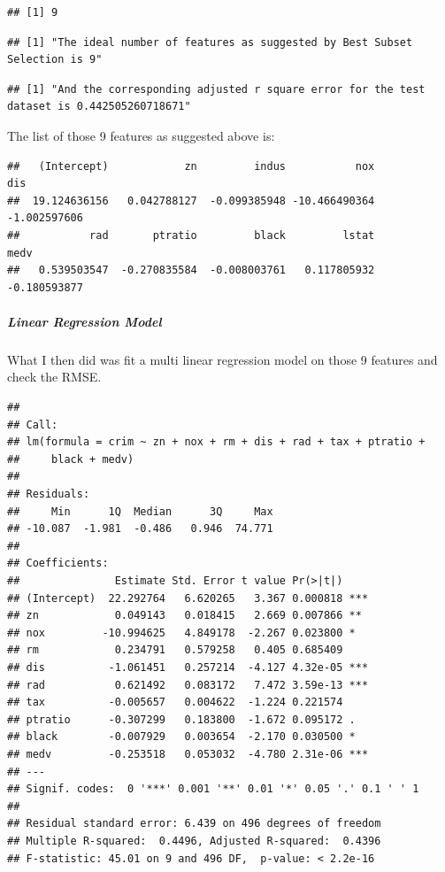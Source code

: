 \documentclass[
]{article}
\begin{document}
\begin{verbatim}
## [1] 9
\end{verbatim}

\begin{verbatim}
## [1] "The ideal number of features as suggested by Best Subset Selection is 9"
\end{verbatim}

\begin{verbatim}
## [1] "And the corresponding adjusted r square error for the test dataset is 0.442505260718671"
\end{verbatim}

The list of those 9 features as suggested above is:

\begin{verbatim}
##   (Intercept)            zn         indus           nox           dis 
##  19.124636156   0.042788127  -0.099385948 -10.466490364  -1.002597606 
##           rad       ptratio         black         lstat          medv 
##   0.539503547  -0.270835584  -0.008003761   0.117805932  -0.180593877
\end{verbatim}

\hypertarget{linear-regression-model}{%
\subparagraph{\texorpdfstring{\textbf{Linear Regression
Model}}{Linear Regression Model}}\label{linear-regression-model}}

What I then did was fit a multi linear regression model on those 9
features and check the RMSE.

\begin{verbatim}
## 
## Call:
## lm(formula = crim ~ zn + nox + rm + dis + rad + tax + ptratio + 
##     black + medv)
## 
## Residuals:
##     Min      1Q  Median      3Q     Max 
## -10.087  -1.981  -0.486   0.946  74.771 
## 
## Coefficients:
##               Estimate Std. Error t value Pr(>|t|)    
## (Intercept)  22.292764   6.620265   3.367 0.000818 ***
## zn            0.049143   0.018415   2.669 0.007866 ** 
## nox         -10.994625   4.849178  -2.267 0.023800 *  
## rm            0.234791   0.579258   0.405 0.685409    
## dis          -1.061451   0.257214  -4.127 4.32e-05 ***
## rad           0.621492   0.083172   7.472 3.59e-13 ***
## tax          -0.005657   0.004622  -1.224 0.221574    
## ptratio      -0.307299   0.183800  -1.672 0.095172 .  
## black        -0.007929   0.003654  -2.170 0.030500 *  
## medv         -0.253518   0.053032  -4.780 2.31e-06 ***
## ---
## Signif. codes:  0 '***' 0.001 '**' 0.01 '*' 0.05 '.' 0.1 ' ' 1
## 
## Residual standard error: 6.439 on 496 degrees of freedom
## Multiple R-squared:  0.4496, Adjusted R-squared:  0.4396 
## F-statistic: 45.01 on 9 and 496 DF,  p-value: < 2.2e-16
\end{verbatim}
\end{document}
